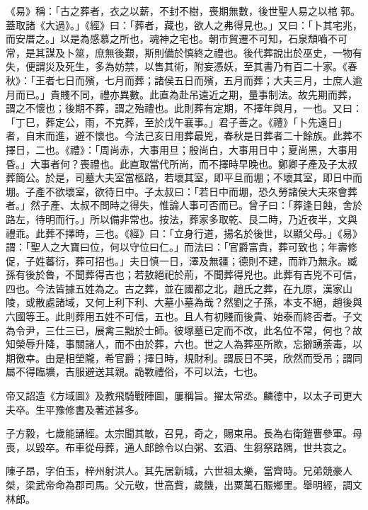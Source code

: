 \begin{pinyinscope}
 《易》稱：「古之葬者，衣之以薪，不封不樹，喪期無數，後世聖人易之以棺郭。蓋取諸《大過》。」《經》曰：「葬者，藏也，欲人之弗得見也。」又曰：「卜其宅兆，而安厝之。」以是為感慕之所也，魂神之宅也。朝市貿遷不可知，石泉頹嚙不可常，是其謀及卜筮，庶無後艱，斯則備於慎終之禮也。後代葬說出於巫史，一物有失，便謂災及死生，多為妨禁，以售其術，附妄憑妖，至其書乃有百二十家。《春秋》：「王者七日而殯，七月而葬；諸侯五日而殯，五月而葬；大夫三月，士庶人逾月而已。」貴賤不同，禮亦異數。此直為赴吊遠近之期，量事制法。故先期而葬，謂之不懷也；後期不葬，謂之殆禮也。此則葬有定期，不擇年與月，一也。又曰：「丁巳，葬定公，雨，不克葬，至於戊午襄事。」君子善之。《禮》「卜先遠日」者，自末而進，避不懷也。今法己亥日用葬最兇，春秋是日葬者二十餘族。此葬不擇日，二也。《禮》：「周尚赤，大事用旦；殷尚白，大事用日中；夏尚黑，大事用昏。」大事者何？喪禮也。此直取當代所尚，而不擇時早晚也。鄭卿子產及子太叔葬簡公。於是，司墓大夫室當柩路，若壞其室，即平旦而堋；不壞其室，即日中而堋。子產不欲壞室，欲待日中。子太叔曰：「若日中而堋，恐久勞諸侯大夫來會葬者。」然子產、太叔不問時之得失，惟論人事可否而已。曾子曰：「葬逢日蝕，舍於路左，待明而行。」所以備非常也。按法，葬家多取乾、艮二時，乃近夜半，文與禮乖。此葬不擇時，三也。《經》曰：「立身行道，揚名於後世，以顯父母。」《易》謂：「聖人之大寶曰位，何以守位曰仁。」而法曰：「官爵富貴，葬可致也；年壽修促，子姓蕃衍，葬可招也。」夫日慎一日，澤及無疆；德則不建，而祚乃無永。臧孫有後於魯，不聞葬得吉也；若敖絕祀於荊，不聞葬得兇也。此葬有吉兇不可信，四也。今法皆據五姓為之。古之葬，並在國都之北，趙氏之葬，在九原，漢家山陵，或散處諸域，又何上利下利、大墓小墓為哉？然劉之子孫，本支不絕，趙後與六國等王。此則葬用五姓不可信，五也。且人有初賤而後貴、始泰而終否者。子文為令尹，三仕三已，展禽三黜於士師。彼塚墓已定而不改，此名位不常，何也？故知榮辱升降，事關諸人，而不由於葬，六也。世之人為葬巫所欺，忘擗踴荼毒，以期徼幸。由是相塋隴，希官爵；擇日時，規財利。謂辰日不哭，欣然而受吊；謂同屬不得臨壙，吉服避送其親。詭斁禮俗，不可以法，七也。



 帝又詔造《方域圖》及教飛騎戰陣圖，屢稱旨。擢太常丞。麟德中，以太子司更大夫卒。生平豫修書及著述甚多。



 子方毅，七歲能誦經。太宗聞其敏，召見，奇之，賜束帛。長為右衛鎧曹參軍。母喪，以毀卒。布車從母葬，通人郎餘令以白粥、玄酒、生芻祭路隅，世共哀之。



 陳子昂，字伯玉，梓州射洪人。其先居新城，六世祖太樂，當齊時。兄弟競豪人桀，梁武帝命為郡司馬。父元敬，世高貲，歲饑，出粟萬石賑鄉里。舉明經，調文林郎。




\end{pinyinscope}
